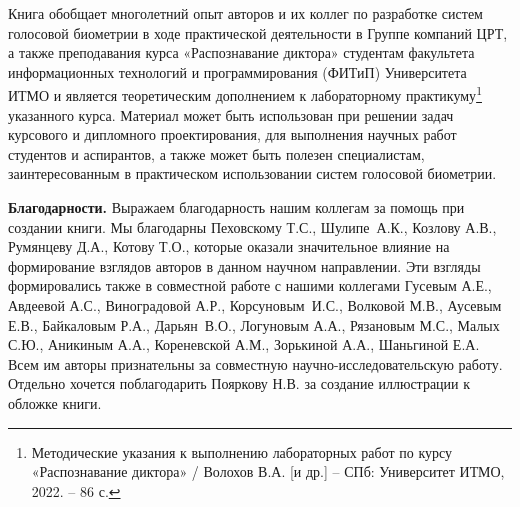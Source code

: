 \documentclass[12pt]{book}
\begin{document}
\large{Книга обобщает многолетний опыт авторов и их коллег по разработке систем голосовой биометрии в ходе практической деятельности в Группе компаний ЦРТ, а также преподавания курса «Распознавание диктора» студентам факультета информационных технологий и программирования (ФИТиП) Университета ИТМО и является теоретическим дополнением к лабораторному практикуму\footnote{Методические указания к выполнению лабораторных работ по курсу
«Распознавание диктора» / Волохов В.А. [и др.] -- СПб: Университет ИТМО, 2022. -- 86 с.} указанного курса. Материал может быть использован при решении задач курсового и дипломного проектирования, для выполнения научных работ студентов и аспирантов, а также может быть полезен специалистам, заинтересованным в практическом использовании систем голосовой биометрии.}

\large{\textbf{Благодарности.} Выражаем благодарность нашим коллегам за помощь при создании книги. Мы благодарны Пеховскому Т.С., Шулипе~А.К., Козлову А.В., Румянцеву Д.А., Котову Т.О., которые оказали значительное влияние на формирование взглядов авторов в данном научном направлении. Эти взгляды формировались также в совместной работе с нашими коллегами Гусевым А.Е., Авдеевой А.С., Виноградовой А.Р., Корсуновым~И.С., Волковой М.В., Аусевым Е.В., Байкаловым Р.А., Дарьян~В.О., Логуновым А.А., Рязановым М.С., Малых С.Ю., Аникиным А.А., Кореневской А.М., Зорькиной А.А., Шаньгиной Е.А. Всем им авторы признательны за совместную научно-исследовательскую работу. Отдельно хочется поблагодарить Пояркову Н.В. за создание иллюстрации к обложке книги.}
\end{document}
